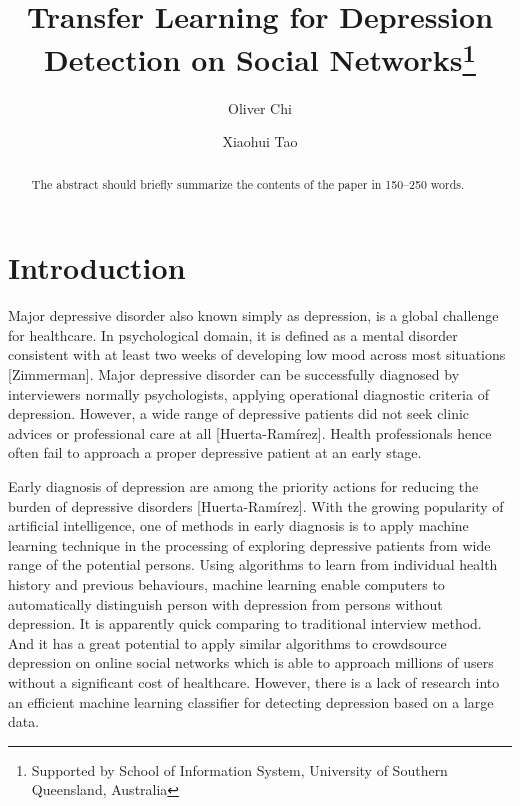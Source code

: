 \documentclass[runningheads]{llncs}
\begin{document}
%
\title{Transfer Learning for Depression Detection on Social Networks\thanks{Supported by School of Information System, University of Southern Queensland, Australia}}
%
%
\author{Oliver Chi\and
Xiaohui Tao }
%
%
%
\maketitle
%
\begin{abstract}
The abstract should briefly summarize the contents of the paper in
150--250 words.
%
\end{abstract}
%
%
%
%
%
%
%
%
%
%
%
%
\pagebreak
\section{Introduction}
%
%
Major depressive disorder also known simply as depression,  is a global challenge for healthcare. In psychological domain, it is defined as a mental disorder consistent with at least two weeks of developing low mood across most situations [Zimmerman]. Major depressive disorder can be successfully diagnosed by interviewers normally psychologists, applying operational diagnostic criteria of depression. However, a wide range of depressive patients did not seek clinic advices or professional care at all [Huerta-Ramírez]. Health professionals hence often fail to approach a proper depressive patient at an early stage. 

Early diagnosis of depression are among the priority actions for reducing the burden of depressive disorders [Huerta-Ramírez]. With the growing popularity of artificial intelligence, one of methods in early diagnosis is to apply machine learning technique in the processing of exploring depressive patients from wide range of the potential persons. Using algorithms to learn from individual health history and previous behaviours, machine learning enable computers to automatically distinguish person with depression from persons without depression. It is apparently quick comparing to traditional interview method. And it has a great potential to apply similar algorithms to crowdsource depression on online social networks which is able to approach millions of users without a significant cost of healthcare. However, there is a lack of research into an efficient machine learning classifier for detecting depression based on a large data.
\end{document}
